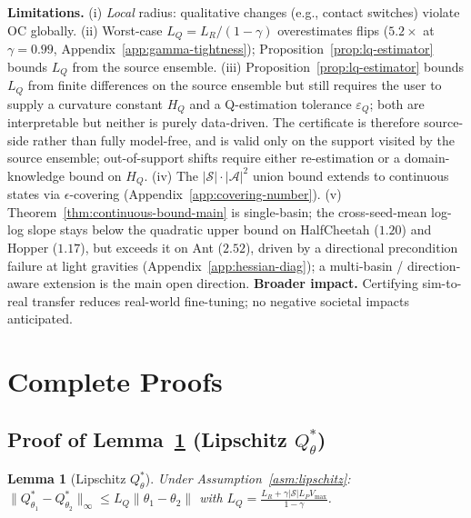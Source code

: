 \documentclass{article}
\newtheorem{lemma}{Lemma}
\newcommand{\cS}{\mathcal{S}}
\newcommand{\cA}{\mathcal{A}}
\newcommand{\Vmax}{V_{\max}}
\begin{document}
\textbf{Limitations.} (i) \emph{Local} radius: qualitative changes (e.g., contact switches) violate OC globally. (ii) Worst-case $L_Q{=}L_R/(1{-}\gamma)$ overestimates flips ($5.2\times$ at $\gamma{=}0.99$, Appendix~\ref{app:gamma-tightness}); Proposition~\ref{prop:lq-estimator} bounds $L_Q$ from the source ensemble. (iii) Proposition~\ref{prop:lq-estimator} bounds $L_Q$ from finite differences on the source ensemble but still requires the user to supply a curvature constant $H_Q$ and a Q-estimation tolerance $\varepsilon_Q$; both are interpretable but neither is purely data-driven. The certificate is therefore source-side rather than fully model-free, and is valid only on the support visited by the source ensemble; out-of-support shifts require either re-estimation or a domain-knowledge bound on $H_Q$. (iv) The $|\cS|{\cdot}|\cA|^2$ union bound extends to continuous states via $\epsilon$-covering (Appendix~\ref{app:covering-number}). (v) Theorem~\ref{thm:continuous-bound-main} is single-basin; the cross-seed-mean log-log slope stays below the quadratic upper bound on HalfCheetah ($1.20$) and Hopper ($1.17$), but exceeds it on Ant ($2.52$), driven by a directional precondition failure at light gravities (Appendix~\ref{app:hessian-diag}); a multi-basin / direction-aware extension is the main open direction. \textbf{Broader impact.} Certifying sim-to-real transfer reduces real-world fine-tuning; no negative societal impacts anticipated.




\newpage
\appendix

\section{Complete Proofs}
\label{app:proofs}

\subsection{Proof of Lemma~\ref{lem:q-lipschitz} (Lipschitz \texorpdfstring{$Q^*_\theta$}{Q*})}

\begin{lemma}[Lipschitz $Q^*_\theta$]
\label{lem:q-lipschitz}
Under Assumption~\ref{asm:lipschitz}: $\|Q^*_{\theta_1} - Q^*_{\theta_2}\|_\infty \leq L_Q\|\theta_1 - \theta_2\|$ with $L_Q = \frac{L_R + \gamma|\cS|L_P\Vmax}{1-\gamma}$.
\end{lemma}
\end{document}
